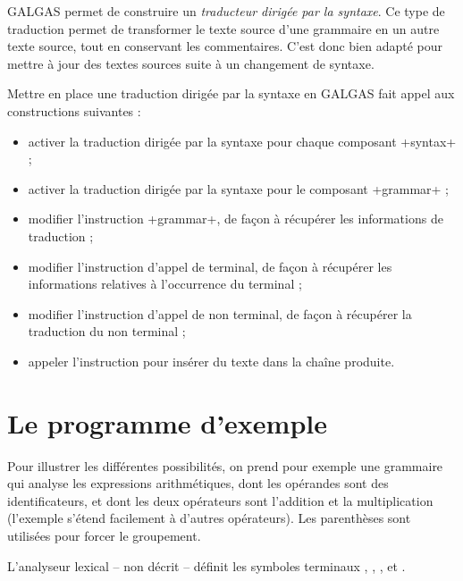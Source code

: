 

GALGAS permet de construire un \emph{traducteur dirigée par la syntaxe}. Ce type de traduction permet de transformer le texte source d'une grammaire en un autre texte source, tout en conservant les commentaires. C'est donc bien adapté pour mettre à jour des textes sources suite à un changement de syntaxe.

Mettre en place une traduction dirigée par la syntaxe en GALGAS fait appel aux constructions suivantes :
\begin{itemize}
  \item activer la traduction dirigée par la syntaxe pour chaque composant \ggs+syntax+ ;
  \item activer la traduction dirigée par la syntaxe pour le composant \ggs+grammar+ ;
  \item modifier l'instruction \ggs+grammar+, de façon à récupérer les informations de traduction ;
  \item modifier l'instruction d'appel de terminal, de façon à récupérer les informations relatives à l'occurrence du terminal ;
  \item modifier l'instruction d'appel de non terminal, de façon à récupérer la traduction du non terminal ;
  \item appeler l'instruction  pour insérer du texte dans la chaîne produite.
\end{itemize}








\section{Le programme d'exemple}

Pour illustrer les différentes possibilités, on prend pour exemple une grammaire qui analyse les expressions arithmétiques, dont les opérandes sont des identificateurs, et dont les deux opérateurs sont l'addition et la multiplication (l'exemple s'étend facilement à d'autres opérateurs). Les parenthèses sont utilisées pour forcer le groupement.

L'analyseur lexical -- non décrit -- définit les symboles terminaux , \galgas{$+$}, \galgas{$*$}, \galgas{$($} et \galgas{$)$}.

